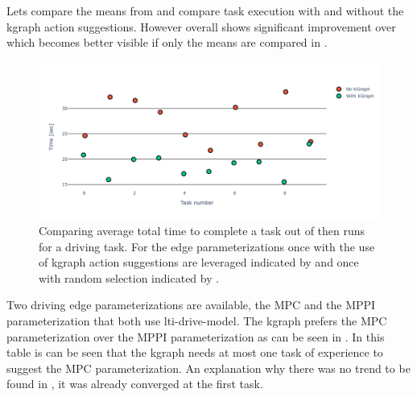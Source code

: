 Lets compare the means from  and compare task execution with and without the \ac{kgraph} action suggestions. However overall  shows significant improvement over  which becomes better visible if only the means are compared in .\bs

\begin{figure}[H]
    \centering
    \includegraphics[width=\textwidth]{figures/results/random_drive_time_vs}
    \caption{Comparing average total time to complete a task out of then runs for a driving task. For the edge parameterizations once with the use of \ac{kgraph} action suggestions are leveraged indicated by  and once with random selection indicated by .}\label{fig:random_drive_time_vs}
\end{figure}

Two driving edge parameterizations are available, the \ac{MPC} and the \ac{MPPI} parameterization that both use lti-drive-model. The \ac{kgraph} prefers the \ac{MPC} parameterization over the \ac{MPPI} parameterization as can be seen in . In this table is can be seen that the \ac{kgraph} needs at most one task of experience to suggest the \ac{MPC} parameterization. An explanation why there was no trend to be found in , it was already converged at the first task.  

